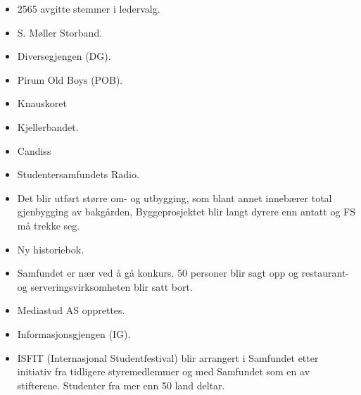 \begin{itemize}
  \item 2565 avgitte stemmer i ledervalg.
  \item S. Møller Storband.
\end{itemize}


\begin{itemize}
  \item Diversegjengen (DG).
\end{itemize}


\begin{itemize}
  \item Pirum Old Boys (POB).
  \item Knauskoret
  \item Kjellerbandet.
\end{itemize}


\begin{itemize}
  \item Candiss
\end{itemize}


\begin{itemize}
  \item Studentersamfundets Radio.
\end{itemize}


\begin{itemize}
  \item Det blir utført større om- og utbygging, som blant annet innebærer total gjenbygging av bakgården,
Byggeprosjektet blir langt dyrere enn antatt og FS må trekke seg.
  \item Ny historiebok.
\end{itemize}


\begin{itemize}
  \item Samfundet er nær ved å gå konkurs. 50 personer blir sagt opp og restaurant- og serveringsvirksomheten blir satt
bort.
  \item Mediastud AS opprettes.
  \item Informasjonsgjengen (IG). 
\end{itemize}


\begin{itemize}
  \item ISFIT (Internasjonal Studentfestival) blir arrangert i Samfundet etter initiativ fra tidligere styremedlemmer og
med Samfundet som en av stifterene. Studenter fra mer enn 50 land deltar.
\end{itemize}

